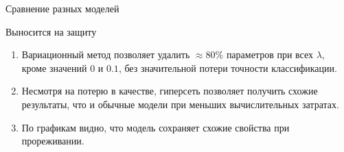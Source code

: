 \documentclass[9pt,pdf,hyperref={unicode}]{beamer}
\begin{document}
\begin{frame}[shrink=5]{Сравнение разных моделей}
\begin{figure}[h]
\begin{minipage}[h]{0.49\linewidth}
\end{minipage}
\hfill
\begin{minipage}[h]{0.49\linewidth}
\end{minipage}

\label{ris:image1}
\end{figure}
\end{frame}


\begin{frame}{Выносится на защиту}
\justifying

	\begin{enumerate}
	\justifying
		\item  Вариационный метод позволяет удалить $ \approx 80\% $ параметров при всех $\lambda$, кроме значений $0$  и $0.1$, без значительной потери точности классификации.
		\item  Несмотря на потерю в качестве, гиперсеть позволяет получить схожие результаты, что и обычные модели при меньших вычислительных затратах.
		\item  По графикам видно, что модель сохраняет схожие свойства при прореживании.
	\end{enumerate}
	

\end{frame}
\end{document}
